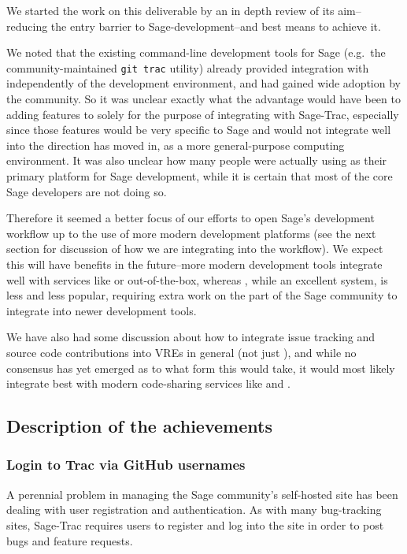 We started the work on this deliverable by an in depth review of its aim--
reducing the entry barrier to Sage-development--and best means to achieve it.

We noted that the existing command-line development tools for Sage (e.g.~the
community-maintained {\tt git trac} utility) already provided integration with
\Trac independently of the development environment, and had gained wide
adoption by the community. So it was unclear exactly what the advantage would
have been to adding features to \cocalc solely for the purpose of integrating
with Sage-Trac, especially since those features would be very specific to Sage
and would not integrate well into the direction \cocalc has moved in, as a more
general-purpose computing environment.  It was also unclear how many people
were actually using \cocalc as their primary platform for Sage development,
while it is certain that most of the core Sage developers are not doing so.


Therefore it seemed a better focus of our efforts to open Sage's development
workflow up to the use of more modern development platforms (see the next
section for discussion of how we are integrating \GitLab into the workflow).
We expect this will have benefits in the future--more modern development tools
integrate well with services like \GitHub or \GitLab out-of-the-box, whereas
\Trac, while an excellent system, is less and less popular, requiring extra
work on the part of the Sage community to integrate into newer development
tools.

We have also had some discussion about how to integrate issue tracking and
source code contributions into VREs in general (not just \cocalc), and while no
consensus has yet emerged as to what form this would take, it would most likely
integrate best with modern code-sharing services like \GitHub and \GitLab.


\hypertarget{description-of-the-achievements}{%
\subsection{Description of the
achievements}\label{description-of-the-achievements}}

\hypertarget{trac-github-login}{%
\subsubsection{Login to Trac via GitHub usernames}\label{trac-github-login}}
A perennial problem in managing the Sage community's self-hosted \Trac site has
been dealing with user registration and authentication.  As with many
bug-tracking sites, Sage-Trac requires users to register and log into the site
in order to post bugs and feature requests.

